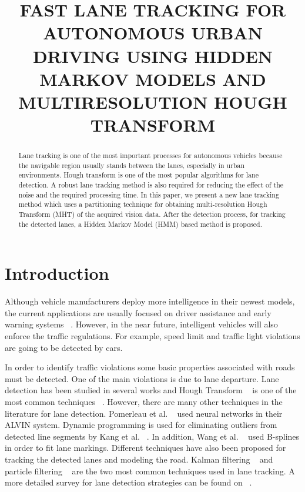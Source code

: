 \documentclass[a4paper,oneside,10pt]{article}
\begin{document}
\pagestyle{empty} %



\title{FAST LANE TRACKING FOR AUTONOMOUS URBAN DRIVING USING HIDDEN MARKOV MODELS AND MULTIRESOLUTION HOUGH TRANSFORM}
\author{}

\maketitle

\begin{abstract}
Lane tracking is one of the most important processes for autonomous vehicles because the navigable region usually stands between the lanes, especially in urban environments. Hough transform is one of the most popular algorithms for lane detection. A robust lane tracking method is also required for reducing the effect of the noise and the required processing time. In this paper, we present a new lane tracking method which uses a partitioning technique for obtaining multi-resolution Hough Transform (MHT) of the acquired vision data. After the detection process, for tracking the detected lanes, a Hidden Markov Model (HMM) based method is proposed. 
\end{abstract}

\section{Introduction}

Although vehicle manufacturers deploy more intelligence in their newest models, the current applications are usually focused on driver assistance and early warning systems ~\cite{connolly09, piao08}. However, in the near future, intelligent vehicles will also enforce the traffic regulations. For example, speed limit and traffic light violations are going to be detected by cars.

In order to identify traffic violations some basic properties associated with roads must be detected. One of the main violations is due to lane departure. Lane detection has been studied in several works and Hough Transform ~\cite{hough62} is one of the most common techniques ~\cite{li04,yu97,mccall06}. However, there are many other techniques in the literature for lane detection. Pomerleau et al. ~\cite{pomerleau95} used neural networks in their ALVIN system. Dynamic programming is used for eliminating outliers from detected line segments by Kang et al. ~\cite{kang03}.  In addition, Wang et al. ~\cite{wang04} used B-splines in order to fit lane markings. Different techniques have also been proposed for tracking the detected lanes and modeling the road. Kalman filtering ~\cite{kreucher98} and particle filtering ~\cite{apostoloff03,zhou06} are the two most common  techniques used in lane tracking. A more detailed survey for lane detection strategies can be found on ~\cite{mccall06}. 
\end{document}
